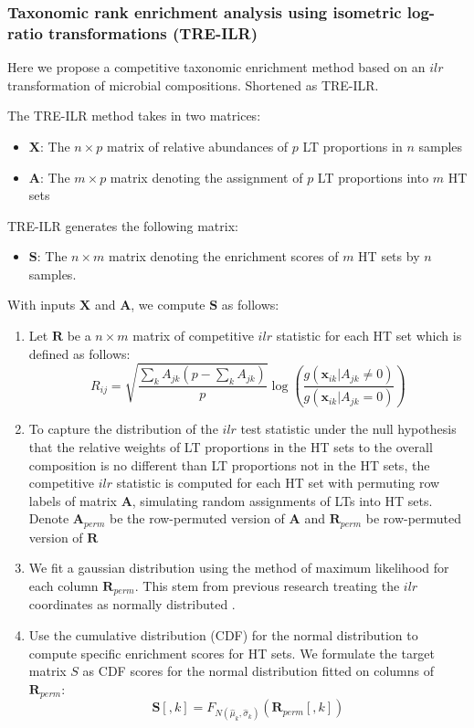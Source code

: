 \documentclass{article}
\begin{document}
\subsubsection{Taxonomic rank enrichment analysis using isometric log-ratio transformations (TRE-ILR)}
Here we propose a competitive taxonomic enrichment method based on an $ilr$ transformation of microbial compositions. Shortened as TRE-ILR.  
\vspace{3mm}

\noindent The TRE-ILR method takes in two matrices: 
\begin{itemize}
    \item $\bm X$: The $n \times p$ matrix of relative abundances of $p$ LT proportions in $n$ samples
    \item $\bm A$: The $m \times p$ matrix denoting the assignment of $p$ LT proportions into $m$ HT sets
\end{itemize}
TRE-ILR generates the following matrix: 
\begin{itemize}
    \item $\bm S$: The $n \times m$ matrix denoting the enrichment scores of $m$ HT sets by $n$ samples. 
\end{itemize}
With inputs $\bm{X}$ and $\bm{A}$, we compute $\bm{S}$ as follows:  
\begin{enumerate}
    \item Let $\bm{R}$ be a $n \times m$ matrix of competitive $ilr$ statistic for each HT set which is defined as follows:
    \begin{equation}
    R_{ij} = \sqrt{\frac{\sum_k A_{jk}(p - \sum_k A_{jk})}{p}} \log \left(\frac{g(\bm{x}_{ik} |A_{jk} \neq 0)}{g(\bm{x}_{ik} | A_{jk} = 0)}\right)
    \end{equation}
    \item To capture the distribution of the $ilr$ test statistic under the null hypothesis that the relative weights of LT proportions in the HT sets to the overall composition is no different than LT proportions not in the HT sets, the competitive $ilr$ statistic is computed for each HT set with permuting row labels of matrix $\bm{A}$, simulating random assignments of LTs into HT sets. Denote $\bm{A}_{perm}$ be the row-permuted version of $\bm{A}$ and $\bm{R}_{perm}$ be row-permuted version of $\bm{R}$
    \item We fit a gaussian distribution using the method of maximum likelihood for each column $\bm{R}_{perm}$. This stem from previous research treating the $ilr$ coordinates as normally distributed \cite{egozcue2005}.  
    \item Use the cumulative distribution (CDF) for the normal distribution to compute specific enrichment scores for HT sets. We formulate the target matrix $S$ as CDF scores for the normal distribution fitted on columns of $\bm{R}_{perm}$:
    \begin{equation}
        \bm{S}[,k] = F_{N(\hat{\mu}_{k},\hat{\sigma}_{k})}(\bm{R}_{perm}[,k])
    \end{equation}
\end{enumerate}
\end{document}
